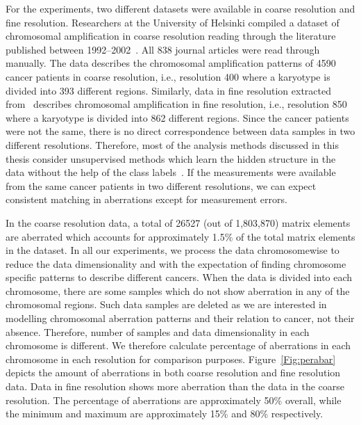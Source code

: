 
For the experiments, two different datasets were available
in coarse resolution and fine resolution. Researchers at 
the University of Helsinki compiled a dataset of chromosomal 
amplification in coarse resolution reading through the 
literature published between 1992--2002~\cite{knuutila2000}. 
All 838 journal articles were read through manually.
The data describes the chromosomal amplification patterns of 
4590 cancer patients in coarse resolution, i.e., resolution 
400 where a karyotype is divided into 393 different regions.
Similarly, data in fine resolution extracted 
from~\cite{progenetix,baudis07} describes chromosomal
amplification in fine resolution, i.e., resolution 850 where
a karyotype is divided into 862 different regions. Since the 
cancer patients were not the same, there is no direct 
correspondence between data samples in two different 
resolutions. Therefore, most of the analysis methods 
discussed in this thesis consider unsupervised methods
which learn the hidden structure in the data without the 
help of the class labels~\cite{bishop06,mitchell97}.
If the measurements were available from the same cancer patients
in two different resolutions, we can expect consistent matching 
in aberrations except for measurement errors.

In the coarse resolution data, a total of 26527 (out of 1,803,870) matrix elements
are aberrated which accounts for approximately 1.5\% of the total matrix 
elements in the dataset. In all our experiments, we  process 
the data chromosomewise to reduce the data dimensionality and 
with the expectation of finding chromosome specific patterns 
to describe different cancers. When the data is divided into 
each chromosome, there are some samples which do not show 
aberration in any of the chromosomal regions. Such data samples
are deleted as we are interested in modelling chromosomal aberration
patterns and their relation to cancer, not their absence.
Therefore, number of samples and data dimensionality
in each chromosome is different. We therefore calculate percentage
of aberrations in each chromosome in each resolution for comparison purposes. Figure~\ref{Fig:perabar} 
depicts the amount of aberrations in both coarse resolution 
and fine resolution data. Data in fine resolution shows more 
aberration than the data in the coarse resolution. The percentage 
of aberrations are approximately 50\% overall, while the minimum 
and maximum are approximately 15\% and 80\% respectively.



